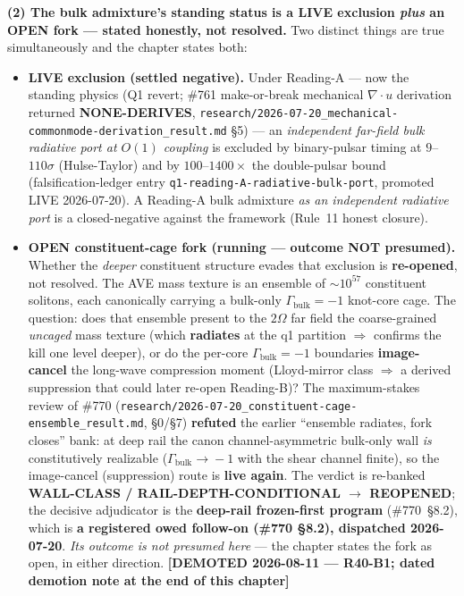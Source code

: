 \begin{warningbox}
\medskip
\noindent\textbf{(2) The bulk admixture's standing status is a LIVE exclusion \emph{plus} an OPEN
fork --- stated honestly, not resolved.} Two distinct things are true simultaneously and the
chapter states both:
\begin{itemize}
    \item \textbf{LIVE exclusion (settled negative).} Under Reading-A --- now the standing physics
    (Q1 revert; \#761 make-or-break mechanical $\nabla\!\cdot\!u$ derivation returned
    \textbf{NONE-DERIVES}, \texttt{research/2026-07-20\_mechanical-commonmode-derivation\_result.md}
    \S5) --- an \emph{independent far-field bulk radiative port at $O(1)$ coupling} is excluded by
    binary-pulsar timing at $9$--$110\sigma$ (Hulse-Taylor) and by $100$--$1400\times$ the
    double-pulsar bound (falsification-ledger entry
    \texttt{q1-reading-A-radiative-bulk-port}, promoted LIVE 2026-07-20). A Reading-A bulk
    admixture \emph{as an independent radiative port} is a closed-negative against the framework
    (Rule~11 honest closure).
    \item \textbf{OPEN constituent-cage fork (running --- outcome NOT presumed).} Whether the
    \emph{deeper} constituent structure evades that exclusion is \textbf{re-opened}, not resolved.
    The AVE mass texture is an ensemble of $\sim\!10^{57}$ constituent solitons, each canonically
    carrying a bulk-only $\Gamma_{\mathrm{bulk}}=-1$ knot-core cage. The question: does that
    ensemble present to the $2\Omega$ far field the coarse-grained \emph{uncaged} mass texture
    (which \textbf{radiates} at the q1 partition $\Rightarrow$ confirms the kill one level deeper),
    or do the per-core $\Gamma_{\mathrm{bulk}}=-1$ boundaries \textbf{image-cancel} the long-wave
    compression moment (Lloyd-mirror class $\Rightarrow$ a derived suppression that could later
    re-open Reading-B)? The maximum-stakes review of \#770
    (\texttt{research/2026-07-20\_constituent-cage-ensemble\_result.md}, \S0/\S7) \textbf{refuted}
    the earlier ``ensemble radiates, fork closes'' bank: at deep rail the canon channel-asymmetric
    bulk-only wall \emph{is} constitutively realizable ($\Gamma_{\mathrm{bulk}}\!\to\!-1$ with the
    shear channel finite), so the image-cancel (suppression) route is \textbf{live again}. The
    verdict is re-banked \textbf{WALL-CLASS / RAIL-DEPTH-CONDITIONAL $\to$ REOPENED}; the decisive
    adjudicator is the \textbf{deep-rail frozen-first program} (\#770~\S8.2), which is
    \textbf{a registered owed follow-on (\#770 \S 8.2), dispatched 2026-07-20}. \emph{Its outcome is not presumed here} --- the chapter states
    the fork as open, in either direction. \textbf{[DEMOTED 2026-08-11 --- R40-B1; dated demotion note at the end of this chapter]}
\end{itemize}


\end{warningbox}
